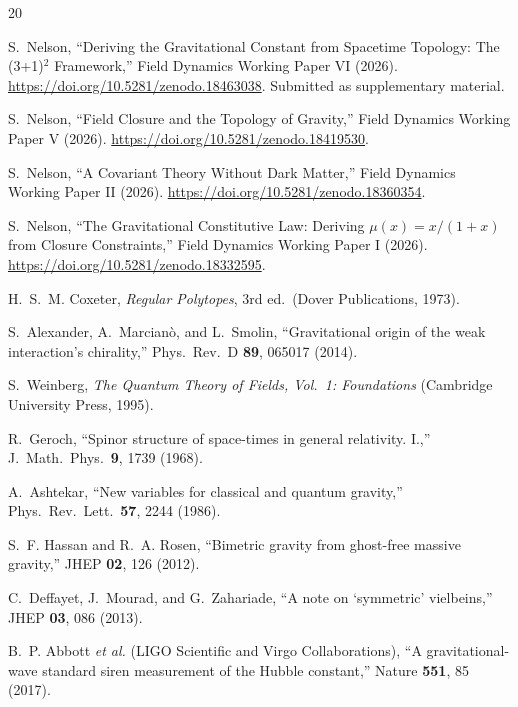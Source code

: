 \documentclass[aps,prd,preprint,superscriptaddress,showpacs,preprintnumbers,amsmath,amssymb,nofootinbib]{revtex4-2}
\begin{document}
\begin{thebibliography}{20}

S.~Nelson, ``Deriving the Gravitational Constant from Spacetime Topology: The (3+1)$^2$ Framework,'' Field Dynamics Working Paper VI (2026). \url{https://doi.org/10.5281/zenodo.18463038}. Submitted as supplementary material.

S.~Nelson, ``Field Closure and the Topology of Gravity,'' Field Dynamics Working Paper V (2026). \url{https://doi.org/10.5281/zenodo.18419530}.

S.~Nelson, ``A Covariant Theory Without Dark Matter,'' Field Dynamics Working Paper II (2026). \url{https://doi.org/10.5281/zenodo.18360354}.

S.~Nelson, ``The Gravitational Constitutive Law: Deriving $\mu(x) = x/(1+x)$ from Closure Constraints,'' Field Dynamics Working Paper I (2026). \url{https://doi.org/10.5281/zenodo.18332595}.

H.~S.~M. Coxeter, \emph{Regular Polytopes}, 3rd ed.\ (Dover Publications, 1973).

S.~Alexander, A.~Marcian\`o, and L.~Smolin, ``Gravitational origin of the weak interaction's chirality,'' Phys.\ Rev.\ D \textbf{89}, 065017 (2014).

S.~Weinberg, \emph{The Quantum Theory of Fields, Vol.\ 1: Foundations} (Cambridge University Press, 1995).

R.~Geroch, ``Spinor structure of space-times in general relativity. I.,'' J.\ Math.\ Phys.\ \textbf{9}, 1739 (1968).

A.~Ashtekar, ``New variables for classical and quantum gravity,'' Phys.\ Rev.\ Lett.\ \textbf{57}, 2244 (1986).

S.~F. Hassan and R.~A. Rosen, ``Bimetric gravity from ghost-free massive gravity,'' JHEP \textbf{02}, 126 (2012).

C.~Deffayet, J.~Mourad, and G.~Zahariade, ``A note on `symmetric' vielbeins,'' JHEP \textbf{03}, 086 (2013).

B.~P. Abbott \textit{et al.} (LIGO Scientific and Virgo Collaborations), ``A gravitational-wave standard siren measurement of the Hubble constant,'' Nature \textbf{551}, 85 (2017).


\end{thebibliography}
\end{document}
